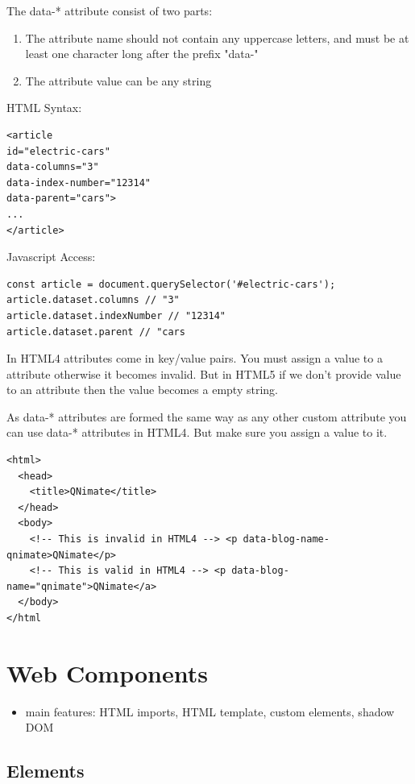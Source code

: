 \documentclass[11pt]{article}
\begin{document}
The data-* attribute consist of two parts:
\begin{enumerate}
\item The attribute name should not contain any uppercase letters, and must be at least one character long after the prefix "data-"
\item The attribute value can be any string
\end{enumerate}

HTML Syntax:
\lstset{breaklines=true,language=HTML,label= ,caption= ,captionpos=b,numbers=none}
\begin{lstlisting}
<article
id="electric-cars"
data-columns="3"
data-index-number="12314"
data-parent="cars">
...
</article>
\end{lstlisting}

Javascript Access:
\lstset{breaklines=true,language=js,label= ,caption= ,captionpos=b,numbers=none}
\begin{lstlisting}
const article = document.querySelector('#electric-cars');
article.dataset.columns // "3"
article.dataset.indexNumber // "12314"
article.dataset.parent // "cars
\end{lstlisting}

In HTML4 attributes come in key/value pairs. You must assign a value to a attribute otherwise it becomes invalid. But in HTML5 if we don’t provide value to an attribute then the value becomes a empty string.

As data-* attributes are formed the same way as any other custom attribute you can use data-* attributes in HTML4. But make sure you assign a value to it.
\lstset{breaklines=true,language=HTML,label= ,caption= ,captionpos=b,numbers=none}
\begin{lstlisting}
<html>
  <head>
    <title>QNimate</title>
  </head>
  <body>
    <!-- This is invalid in HTML4 --> <p data-blog-name-qnimate>QNimate</p>
    <!-- This is valid in HTML4 --> <p data-blog-name="qnimate">QNimate</a>
  </body>
</html
\end{lstlisting}
\section{Web Components}
\label{sec:org2a7816b}
\begin{itemize}
\item main features: HTML imports, HTML template, custom elements, shadow DOM
\end{itemize}
\subsection{Elements}
\label{sec:orgaa54a42}
\end{document}
